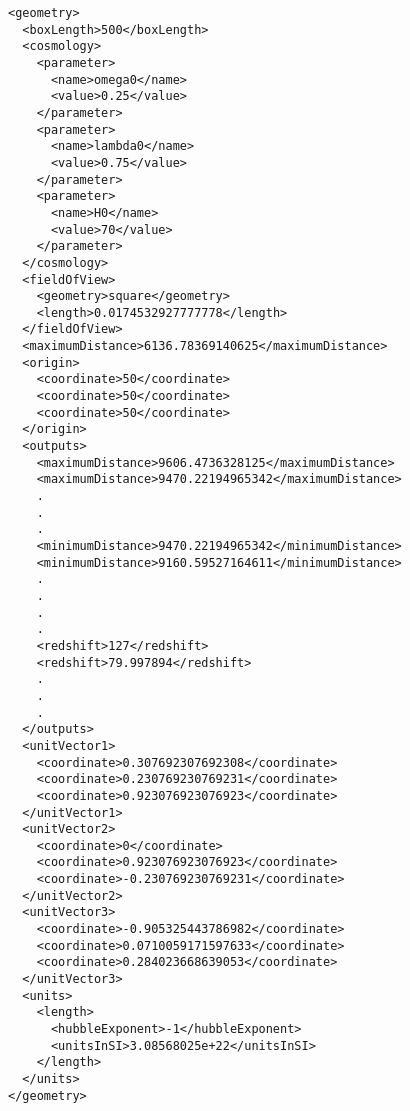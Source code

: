 \begin{verbatim}
<geometry>
  <boxLength>500</boxLength>
  <cosmology>
    <parameter>
      <name>omega0</name>
      <value>0.25</value>
    </parameter>
    <parameter>
      <name>lambda0</name>
      <value>0.75</value>
    </parameter>
    <parameter>
      <name>H0</name>
      <value>70</value>
    </parameter>
  </cosmology>
  <fieldOfView>
    <geometry>square</geometry>
    <length>0.0174532927777778</length>
  </fieldOfView>
  <maximumDistance>6136.78369140625</maximumDistance>
  <origin>
    <coordinate>50</coordinate>
    <coordinate>50</coordinate>
    <coordinate>50</coordinate>
  </origin>
  <outputs>
    <maximumDistance>9606.4736328125</maximumDistance>
    <maximumDistance>9470.22194965342</maximumDistance>
    .
    .
    .
    <minimumDistance>9470.22194965342</minimumDistance>
    <minimumDistance>9160.59527164611</minimumDistance>
    .
    .
    .
    .
    <redshift>127</redshift>
    <redshift>79.997894</redshift>
    .
    .
    .
  </outputs>
  <unitVector1>
    <coordinate>0.307692307692308</coordinate>
    <coordinate>0.230769230769231</coordinate>
    <coordinate>0.923076923076923</coordinate>
  </unitVector1>
  <unitVector2>
    <coordinate>0</coordinate>
    <coordinate>0.923076923076923</coordinate>
    <coordinate>-0.230769230769231</coordinate>
  </unitVector2>
  <unitVector3>
    <coordinate>-0.905325443786982</coordinate>
    <coordinate>0.0710059171597633</coordinate>
    <coordinate>0.284023668639053</coordinate>
  </unitVector3>
  <units>
    <length>
      <hubbleExponent>-1</hubbleExponent>
      <unitsInSI>3.08568025e+22</unitsInSI>
    </length>
  </units>
</geometry>
\end{verbatim}
